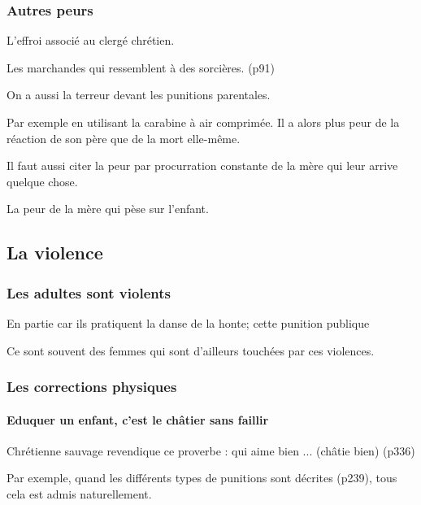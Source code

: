 \documentclass[a4paper, 11pt, hidelinks]{article}
\newcommand{\bs}{\bigskip}
\begin{document}
\subsubsection{Autres peurs}

L'effroi associé au clergé chrétien. 

\bs

Les marchandes qui ressemblent à des sorcières. (p91)


\bs
On a aussi la terreur devant les punitions parentales.

Par exemple en utilisant la carabine à air comprimée. Il a alors plus peur de la réaction de son père que de la mort elle-même.

\bs

Il faut aussi citer la peur par procurration constante de la mère qui leur arrive quelque chose.

La peur de la mère qui pèse sur l'enfant.



\subsection{La violence}

\subsubsection{Les adultes sont violents}

En partie car ils pratiquent la danse de la honte; cette punition publique 

\bs

Ce sont souvent des femmes qui sont d'ailleurs touchées par ces violences.




\subsubsection{Les corrections physiques}

\paragraph{Eduquer un enfant, c'est le châtier sans faillir}

Chrétienne sauvage revendique ce proverbe : qui aime bien ... (châtie bien) (p336)

\bs

Par exemple, quand les différents types de punitions sont décrites (p239), tous cela est admis naturellement.
\end{document}
